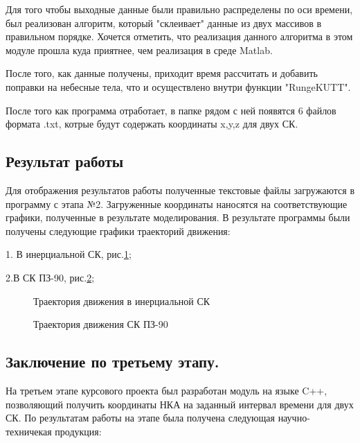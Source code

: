 \documentclass[]{article}
\begin{document}
Для того чтобы выходные данные были правильно распределены по оси времени, был реализован алгоритм, который "склеивает" данные из двух массивов в правильном порядке. Хочется отметить, что реализация данного алгоритма в этом модуле прошла куда приятнее, чем реализация в среде Matlab.

После того, как данные получены, приходит время рассчитать и добавить поправки на небесные тела, что и осуществлено внутри функции "RungeKUTT".

После того как программа отработает, в папке рядом с ней появятся 6 файлов формата .txt, котрые будут содержать координаты x,y,z для двух СК.




\subsection{Результат работы}
Для отображения результатов работы полученные текстовые файлы загружаются в программу с этапа №2. Загруженные координаты наносятся на соответствующие графики, полученные в результате моделирования.
В результате программы были получены следующие графики траекторий движения:

1. В инерциальной СК, рис.\ref{inertz};

2.В СК ПЗ-90, рис.\ref{PZ};




\begin{figure}[h!]
	
	\caption{Траектория движения в инерциальной СК  }
	\label{inertz}
\end{figure}

\begin{figure}[h!]
	
	\centering{\texttt{[image: PZ90]}}
	\caption{Траектория движения  СК ПЗ-90 }
	\label{PZ}
\end{figure}




\subsection{Заключение по третьему этапу.}

На третьем этапе курсового проекта был разработан модуль на языке C++, позволяющий получить координаты НКА на заданный интервал времени для двух СК.  По результатам работы на этапе была получена следующая научно-техничекая продукция:
\end{document}
